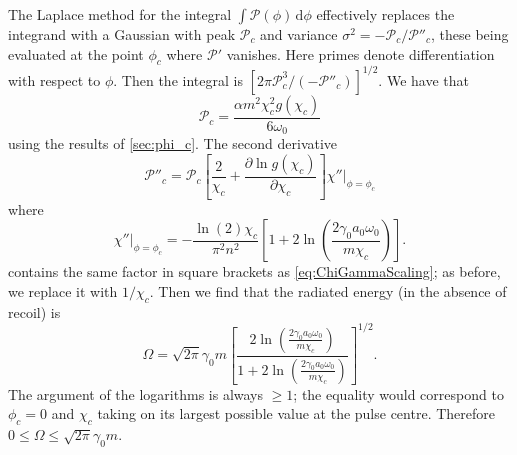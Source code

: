 \documentclass[reprint,superscriptaddress,amsmath,amssymb,aps,pra]{revtex4-1}
\newcommand{\rmd}{\mathrm{d}}
\newcommand{\lnTwo}{\ln(2)}
\newcommand{\Power}{\mathcal{P}}
\begin{document}
The Laplace method for the integral $\int\!\Power(\phi)\,\rmd\phi$
effectively replaces the integrand with a Gaussian with peak
$\Power_c$ and variance $\sigma^2 = -\Power_c/\Power''_c$, these being
evaluated at the point $\phi_c$ where $\Power'$ vanishes. Here
primes denote differentiation with respect to $\phi$.
Then the integral is $[2\pi \Power_c^3/(-\Power''_c)]^{1/2}$. We have
that
	\begin{equation}
	\Power_c = \frac{\alpha m^2 \chi_c^2 g(\chi_c)}{6 \omega_0}
	\end{equation}
using the results of \cref{sec:phi_c}. The second derivative
	\begin{equation}
	\Power''_c =
		\Power_c
		\left[ \frac{2}{\chi_c} + \frac{\partial\ln g(\chi_c)}{\partial\chi_c} \right]
		\left. \chi'' \right|_{\phi=\phi_c}
	\label{eq:SecondDvPower}
	\end{equation}
where
	\begin{equation}
	\left. \chi'' \right|_{\phi=\phi_c} =
		-\frac{\lnTwo \chi_c}{\pi^2 n^2}
		\left[
			1 +
			2 \ln\!\left( \frac{2\gamma_0 a_0 \omega_0}{m \chi_c} \right)
		\right].
	\label{eq:SecondDvChi}
	\end{equation}
 contains the same factor in square brackets
as \cref{eq:ChiGammaScaling}; as before, we replace it with $1/\chi_c$.
Then we find that the radiated energy (in the absence of recoil) is
	\begin{equation}
	\Omega =
		\sqrt{2\pi} \gamma_0 m
		\left[
			\frac{2\ln\!\left( \frac{2\gamma_0 a_0 \omega_0}{m \chi_c} \right)}
					{1+2\ln\!\left( \frac{2\gamma_0 a_0 \omega_0}{m \chi_c} \right)}
		\right]^{1/2}.
	\label{eq:RadEnergyNoRecoil}
	\end{equation}
The argument of the logarithms is always $\geq 1$; the equality would
correspond to $\phi_c = 0$ and $\chi_c$ taking on its largest possible value
at the pulse centre. Therefore $0 \leq \Omega \leq \sqrt{2\pi} \gamma_0 m$.
\end{document}
